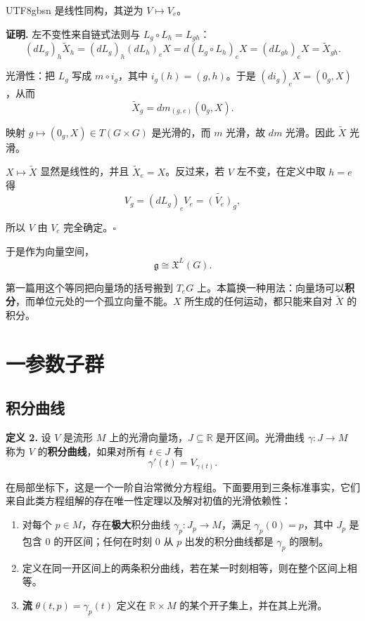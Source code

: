 \documentclass[11pt]{article}
\begin{document}
\begin{CJK*}{UTF8}{gbsn}
是线性同构，其逆为 $V \mapsto V_e$。

\textbf{证明.} 左不变性来自链式法则与 $L_g \circ L_h = L_{gh}$：
\[
(dL_g)_h \widetilde{X}_h = (dL_g)_h (dL_h)_e X = d(L_g \circ L_h)_e X = (dL_{gh})_e X = \widetilde{X}_{gh}.
\]

光滑性：把 $L_g$ 写成 $m \circ i_g$，其中 $i_g(h) = (g, h)$。于是 $(di_g)_e X = (0_g, X)$，从而
\[
\widetilde{X}_g = dm_{(g, e)}(0_g, X).
\]

映射 $g \mapsto (0_g, X) \in T(G \times G)$ 是光滑的，而 $m$ 光滑，故 $dm$ 光滑。因此 $\widetilde{X}$ 光滑。

$X \mapsto \widetilde{X}$ 显然是线性的，并且 $\widetilde{X}_e = X$。反过来，若 $V$ 左不变，在定义中取 $h = e$ 得
\[
V_g = (dL_g)_e V_e = \widetilde{(V_e)}_g,
\]

所以 $V$ 由 $V_e$ 完全确定。$\square$

于是作为向量空间，
\[
\mathfrak{g} \cong \mathfrak{X}^L(G).
\]

第一篇用这个等同把向量场的括号搬到 $T_eG$ 上。本篇换一种用法：向量场可以\textbf{积分}，而单位元处的一个孤立向量不能。$X$ 所生成的任何运动，都只能来自对 $\widetilde{X}$ 的积分。

\section{一参数子群}

\subsection{积分曲线}

\textbf{定义 2.} 设 $V$ 是流形 $M$ 上的光滑向量场，$J \subseteq \mathbb{R}$ 是开区间。光滑曲线 $\gamma : J \to M$ 称为 $V$ 的\textbf{积分曲线}，如果对所有 $t \in J$ 有
\[
\gamma'(t) = V_{\gamma(t)}.
\]

在局部坐标下，这是一个一阶自治常微分方程组。下面要用到三条标准事实，它们来自此类方程组解的存在唯一性定理以及解对初值的光滑依赖性：

\begin{enumerate}
  \item 对每个 $p \in M$，存在\textbf{极大}积分曲线 $\gamma_p : J_p \to M$，满足 $\gamma_p(0) = p$，其中 $J_p$ 是包含 $0$ 的开区间；任何在时刻 $0$ 从 $p$ 出发的积分曲线都是 $\gamma_p$ 的限制。
  \item 定义在同一开区间上的两条积分曲线，若在某一时刻相等，则在整个区间上相等。
  \item \textbf{流} $\theta(t, p) = \gamma_p(t)$ 定义在 $\mathbb{R} \times M$ 的某个开子集上，并在其上光滑。
\end{enumerate}


\end{CJK*}
\end{document}
